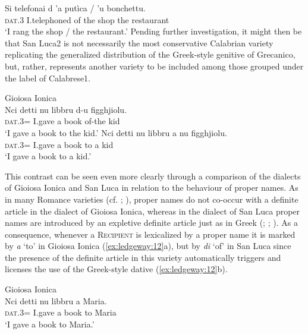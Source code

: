 \documentclass[output=paper,modfonts,nonflat,colorlinks,citecolor=brown]{langsci/langscibook}
\begin{document}
{    \ex
    \gll Si  telefonai  d  ’a  putìca /  ’u  bonchettu.\\
    \textsc{dat}.3  I.telephoned  of  the  shop  the  restaurant\\
    \glt `I rang the shop / the restaurant.'
    \z
    \z
    Pending further investigation, it might then be that San Luca2 is not necessarily the most conservative Calabrian variety replicating the generalized distribution of the Greek-style genitive of Grecanico, but, rather, represents another variety to be included among those grouped under the label of Calabrese1.
}

\ea\label{ex:ledgeway:11}
  Gioiosa Ionica\\
\ea
	\gll Nci  detti  nu  libbru  d-u  figghjiolu.\\
        \textsc{dat}.3=  I.gave   a  book  of-the   kid  \\
        \glt `I gave a book to the kid.'
\ex
	\gll Nci  detti  nu  libbru  a  nu  figghjiolu.\\
        \textsc{dat}.3=  I.gave   a  book  to  a   kid  \\
        \glt `I gave a book to a kid.'
        \z
        \z

This contrast can be seen even more clearly through a comparison of the dialects of Gioiosa Ionica and San Luca in relation to the behaviour of proper names. As in many Romance varieties (cf. \citealt[103-104]{Ledgeway2012}; \citealt[111-112]{Ledgeway2015}), proper names do not co-occur with a definite article in the dialect of Gioiosa Ionica, whereas in the dialect of San Luca proper names are introduced by an expletive definite article just as in Greek (\citealt[198]{Mackridge1985}; \citealt[276-278]{HoltonMackridgePhilippaki-Warburton1997}; \citealt[208-209]{Ledgeway2013}). As a consequence, whenever a \textsc{Recipient} is lexicalized by a proper name it is marked by \textit{a} ‘to’ in Gioiosa Ionica (\ref{ex:ledgeway:12}a), but by \textit{di} ‘of’ in San Luca since the presence of the definite article in this variety automatically triggers and licenses the use of the Greek-style dative (\ref{ex:ledgeway:12}b).

\ea\label{ex:ledgeway:12}

  \ea  Gioiosa Ionica\\
 \gll Nci      detti   nu   libbru    a   Maria.\\
               \textsc{dat}.3=  I.gave  a  book  to   Maria\\
               \glt `I gave a book to Maria.'
               
\end{document}
